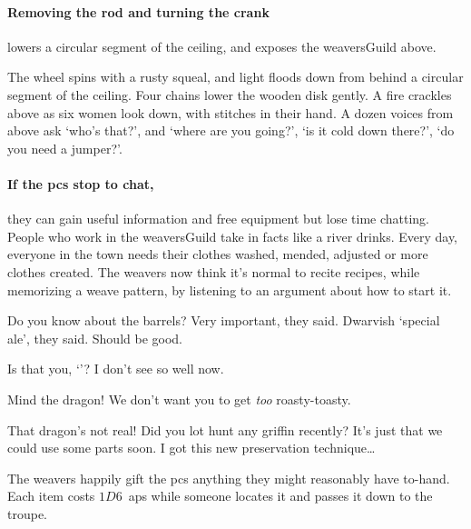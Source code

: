 \begin{multicols}{2}
\paragraph{Removing the rod and turning the crank}
lowers a circular segment of the ceiling, and exposes the \gls{weaversGuild} above.

\begin{boxtext}
  The wheel spins with a rusty squeal, and light floods down from behind a circular segment of the ceiling.
  Four chains lower the wooden disk gently.
  A fire crackles above as six women look down, with stitches in their hand.
  A dozen voices from above ask `who's that?', and `where are you going?', `is it cold down there?', `do you need a jumper?'.
\end{boxtext}

\paragraph{If the \glspl{pc} stop to chat,}
they can gain useful information and free \gls{equipment} but lose time chatting.
People who work in the \gls{weaversGuild} take in facts like a river drinks.
Every day, everyone in the town needs their clothes washed, mended, adjusted or more clothes created.
The \glspl{weaver} now think it's normal to recite recipes, while memorizing a weave pattern, by listening to an argument about how to start it.

\begin{speechtext}

  Do you know about the barrels?
  Very important, they said.
  Dwarvish `special ale', they said.
  Should be good.

  {\small
    Is that you, `\composeHumanName'?
    I don't see so well now.
  }

  \vspace{-.5em}
  {\large
    Mind the dragon!
    We don't want you to get \emph{too} roasty-toasty.
  }

  That dragon's not real!
  Did you lot hunt any \gls{griffin} recently?
  It's just that we could use some parts soon.
  I got this new preservation technique\ldots

  \vspace{-.3em}
\end{speechtext}

The \glspl{weaver} happily gift the \glspl{pc} anything they might reasonably have to-hand.
Each item costs $1D6$~\glspl{ap} while someone locates it and passes it down to the troupe.


\end{multicols}
